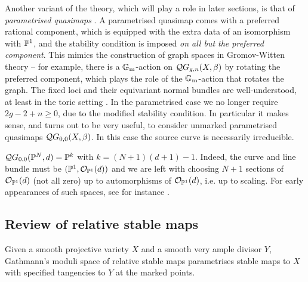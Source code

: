 Another variant of the theory, which will play a role in later sections, is that of \emph{parametrised quasimaps} \cite[\S 7]{CF-K}. A parametrised quasimap comes with a preferred rational component, which is equipped with the extra data of an isomorphism with $\mathbb P^1$, and the stability condition is imposed \emph{on all but the preferred component}. This mimics the construction of graph spaces in Gromov-Witten theory -- for example, there is a $\mathbb{G}_{\text{m}}$-action on $\mathcal{Q}G_{g,n}(X,\beta)$ by rotating the preferred component, which plays the role of the $\mathbb{G}_{\text{m}}$-action that rotates the graph. The fixed loci and their equivariant normal bundles are well-understood, at least in the toric setting \cite[\S 7]{CF-K}.  In the parametrised case we no longer require $2g-2+n\geq 0$, due to the modified stability condition. In particular it makes sense, and turns out to be very useful, to consider unmarked parametrised quasimaps $\mathcal{Q}G_{0,0}(X,\beta)$. In this case the source curve is necessarily irreducible. 

\begin{example} $\mathcal{Q}G_{0,0}(\mathbb P^N,d) = \mathbb P^k$ with $k=(N+1)(d+1)-1$. Indeed, the curve and line bundle must be $(\mathbb P^1,\mathcal O_{\mathbb P^1}(d))$ and we are left with choosing $N+1$ sections of $\mathcal O_{\mathbb P^1}(d)$ (not all zero) up to automorphisms of $\mathcal O_{\mathbb P^1}(d)$, i.e. up to scaling. For early appearances of such spaces, see for instance \cite{Givental-mirror} \cite{MorrisonPlesser} \cite{Bertram}.\end{example}

\subsection{Review of relative stable maps} \label{Subsection relative stable maps} Given a smooth projective variety $X$ and a smooth very ample divisor $Y$, Gathmann's moduli space of relative stable maps parametrises stable maps to $X$ with specified tangencies to $Y$ at the marked points.


